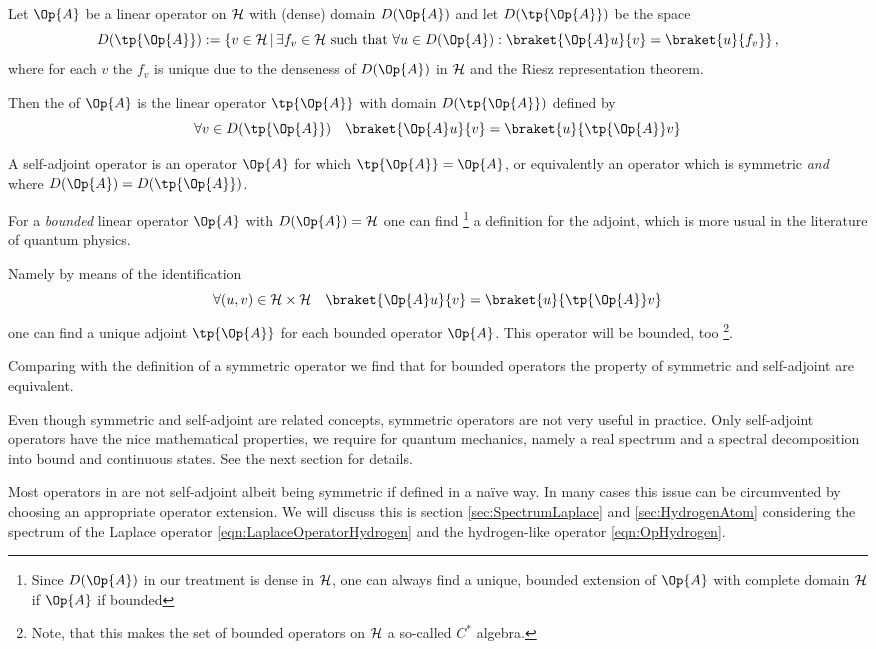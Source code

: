 \begin{defn}
	Let $\Op{A}$ be a linear operator on $\mathcal{H}$ with (dense) domain $D(\Op{A})$
	and let $D(\tp{\Op{A}})$ be the space
	\[ D(\tp{\Op{A}}) := \left\{ v \in \hilbert \, \middle| \,
		\exists f_v \in \hilbert \ \text{such that} \
		\forall u \in D(\Op{A}): \braket{\Op{A} u}{v} = \braket{u}{f_v} \right\},
	\]
	where for each $v$ the $f_v$ is unique due to the denseness
	of $D(\Op{A})$ in $\mathcal{H}$ and the Riesz representation theorem.

	Then the  of $\Op{A}$
	is the linear operator $\tp{\Op{A}}$ with domain $D(\tp{\Op{A}})$
	defined by
	\[ \forall v \in D(\tp{\Op{A}}) \quad \braket{\Op{A} u}{v} = \braket{u}{\tp{\Op{A}} v} \]
\end{defn}

\begin{defn}
	A self-adjoint operator is an operator $\Op{A}$ for which $\tp{\Op{A}} = \Op{A}$,
	or equivalently an operator which is symmetric \emph{and} where
	$D(\Op{A}) = D(\tp{\Op{A}})$.
\end{defn}

\begin{rem}
	For a \emph{bounded} linear operator $\Op{A}$ with $D(\Op{A}) = \hilbert$
	one can find%
	\footnote{Since $D(\Op{A})$ in our treatment is dense in $\mathcal{H}$,
	one can always find a unique, bounded extension of $\Op{A}$ with complete
	domain $\mathcal{H}$ if $\Op{A}$ if bounded}
	a definition for the adjoint,
	which is more usual in the literature of quantum physics.

	\noindent
	Namely by means of the identification
	\[ \forall (u,v) \in \hilbert \times \hilbert \quad \braket{\Op{A} u}{v} = \braket{u}{\tp{\Op{A}} v} \]
	one can find a unique adjoint $\tp{\Op{A}}$ for each bounded operator $\Op{A}$.
	This operator will be bounded, too%
	\footnote{Note, that this makes the set of bounded operators on $\mathcal{H}$
	a so-called $C^\ast$ algebra.}.

	Comparing with the definition of a symmetric operator we find that for
	bounded operators the property of symmetric and self-adjoint are equivalent.
\end{rem}

\begin{rem}
	Even though symmetric and self-adjoint are related concepts,
	symmetric operators are not very useful in practice.
	Only self-adjoint operators have the nice mathematical properties,
	we require for quantum mechanics, namely a real spectrum
	and a spectral decomposition into bound and continuous states.
	See the next section for details.

	Most operators in \QM are not self-adjoint albeit being symmetric
	if defined in a na\"{i}ve way.
	In many cases this issue can be circumvented
	by choosing an appropriate operator extension.
	We will discuss this 
	is section \vref{sec:SpectrumLaplace} and \vref{sec:HydrogenAtom}
	considering the spectrum of the Laplace operator
	\eqref{eqn:LaplaceOperatorHydrogen}
	and the hydrogen-like operator \eqref{eqn:OpHydrogen}.
\end{rem}

